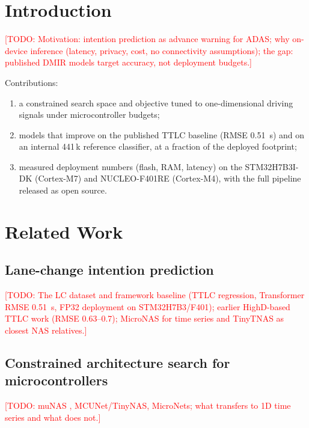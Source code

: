 \documentclass[journal]{IEEEtran}
\newcommand{\todo}[1]{\textcolor{red}{[TODO: #1]}}
\begin{document}
\section{Introduction}
\todo{Motivation: intention prediction as advance warning for ADAS; why
on-device inference (latency, privacy, cost, no connectivity assumptions);
the gap: published DMIR models target accuracy, not deployment budgets.}

Contributions:
\begin{enumerate}
  \item a constrained search space and objective tuned to one-dimensional
        driving signals under microcontroller budgets;
  \item models that improve on the published TTLC baseline (RMSE 0.51~s) and on
        an internal 441\,k reference classifier, at a fraction of the deployed
        footprint;
  \item measured deployment numbers (flash, RAM, latency) on the STM32H7B3I-DK
        (Cortex-M7) and NUCLEO-F401RE (Cortex-M4), with the full pipeline
        released as open source.
\end{enumerate}

\section{Related Work}
\subsection{Lane-change intention prediction}
\todo{The LC dataset and framework baseline \cite{lcintention2026} (TTLC
regression, Transformer RMSE 0.51~s, FP32 deployment on STM32H7B3/F401);
earlier HighD-based TTLC work (RMSE 0.63--0.7); MicroNAS for time series and
TinyTNAS as closest NAS relatives.}

\subsection{Constrained architecture search for microcontrollers}
\todo{muNAS \cite{liberis2021munas}, MCUNet/TinyNAS, MicroNets; what transfers
to 1D time series and what does not.}
\end{document}
